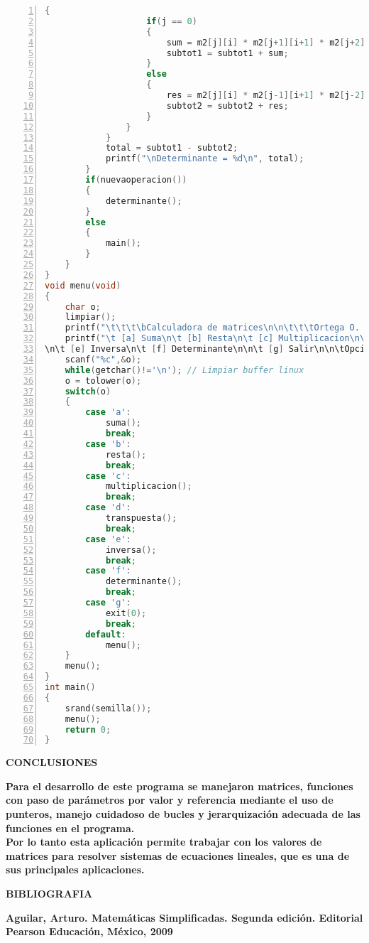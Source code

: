 \documentclass[letterpaper]{article}
\begin{document}
\begin{lstlisting}[language=C, numbers=left, showstringspaces=false, tabsize=3]
				{
					if(j == 0)
					{
						sum = m2[j][i] * m2[j+1][i+1] * m2[j+2][i+2];
						subtot1 = subtot1 + sum;
					}
					else
					{
						res = m2[j][i] * m2[j-1][i+1] * m2[j-2][i+2];
						subtot2 = subtot2 + res;
					}
				}
			}
			total = subtot1 - subtot2;
			printf("\nDeterminante = %d\n", total);
		}
		if(nuevaoperacion())
		{
			determinante();
		}
		else
		{
			main();
		}
	}
}
void menu(void)
{
	char o;
	limpiar();
	printf("\t\t\t\bCalculadora de matrices\n\n\t\t\tOrtega O. Eder - 1CM4\n\n\n");
	printf("\t [a] Suma\n\t [b] Resta\n\t [c] Multiplicacion\n\t [d] Transpuesta
\n\t [e] Inversa\n\t [f] Determinante\n\n\t [g] Salir\n\n\tOpcion: ");
	scanf("%c",&o);
	while(getchar()!='\n'); // Limpiar buffer linux
	o = tolower(o);
	switch(o)
	{
		case 'a':
			suma();
			break;
		case 'b':
			resta();
			break;
		case 'c':
			multiplicacion();
			break;
		case 'd':
			transpuesta();
			break;
		case 'e':
			inversa();
			break;
		case 'f':
			determinante();
			break;
		case 'g':
			exit(0);
			break;
		default:
			menu();
	}
	menu();
}
int main()
{
	srand(semilla());
	menu();
	return 0;
}
\end{lstlisting}
\clearpage

\begin{center}
\textbf{\LARGE CONCLUSIONES\\}
\vspace{1.0cm}
\end{center}

\begin{flushleft}
\textbf{\Large Para el desarrollo de este programa se manejaron matrices, funciones con paso de par\'ametros por valor y referencia mediante el uso de punteros, manejo cuidadoso de bucles y jerarquizaci\'on adecuada de las funciones en el programa.\\}
\vspace{0.5cm}
\textbf{\Large Por lo tanto esta aplicaci\'on permite trabajar con los valores de matrices para resolver sistemas de ecuaciones lineales, que es una de sus principales aplicaciones.\\}
\vspace{2.0cm}
\end{flushleft}

\begin{center}
\textbf{\LARGE BIBLIOGRAFIA\\}
\vspace{1.0cm}
\end{center}

\begin{flushleft}
\textbf{\Large Aguilar, Arturo. Matem\'aticas Simplificadas. Segunda edici\'on. Editorial Pearson Educaci\'on, M\'exico, 2009\\}
\end{flushleft}


\clearpage

\thispagestyle{empty}
\end{document}

